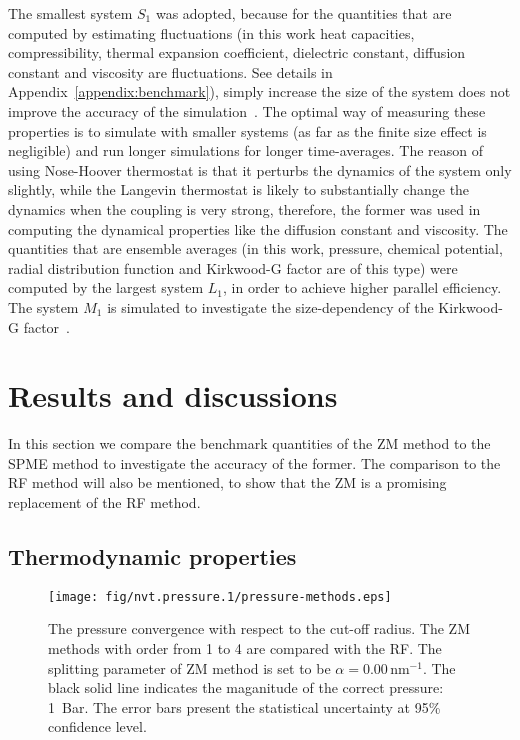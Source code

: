 \documentclass[aip,jcp,a4paper,preprint,unsortedaddress,onecolumn,fleqn]{revtex4-1}
\newcommand{\systemsb}{S_1}
\newcommand{\systemmb}{M_1}
\newcommand{\systemlb}{L_1}
\begin{document}

The smallest system $\systemsb$ was adopted,
because for the quantities that are computed  by estimating fluctuations (in this
work heat capacities, compressibility, thermal expansion coefficient, dielectric constant, diffusion constant and
viscosity are fluctuations. See details in Appendix~\ref{appendix:benchmark}), simply increase the size of the
system does not improve the accuracy of the 
simulation~\cite{milchev1986fluctuations,ferrenberg1991statistical}.
The optimal way of measuring these properties
is to simulate with smaller systems (as far as the finite size effect is negligible) and run longer simulations for longer time-averages.
The reason of using Nose-Hoover thermostat is that
it perturbs the dynamics of the system only slightly, while the
Langevin thermostat is likely to substantially change the dynamics
when the coupling is very strong, therefore, the former was used in computing the dynamical
properties like the diffusion constant and viscosity.
The quantities that
are ensemble averages (in this work, pressure, chemical potential, radial distribution function and Kirkwood-G factor are of this type)
were computed by the largest system $\systemlb$,
in order to achieve higher parallel efficiency.
The system $\systemmb$ is simulated to investigate the size-dependency of the
Kirkwood-G factor~\cite{vanderSpoel2006origin}.

\section{Results and discussions}

In this section we compare the benchmark quantities of the ZM method
to the SPME method to investigate the accuracy of the former.
The comparison to the RF method will also be mentioned, to show that
the ZM is a promising replacement of the RF method.

\subsection{Thermodynamic properties}

\begin{figure}
  \centering
  \texttt{[image: fig/nvt.pressure.1/pressure-methods.eps]}
  \caption{The pressure convergence with respect to the cut-off radius.
    The ZM methods with order from 1 to 4 are compared with the RF. 
    The splitting parameter of ZM method is set to be $\alpha = 0.00\,\textrm{nm}^{-1}$.
    The black solid line indicates the maganitude  of the correct pressure: 1~Bar.
    The error bars present the statistical uncertainty at 95\% confidence level.
  }
  \label{fig:pres-comp}
\end{figure}
\end{document}
